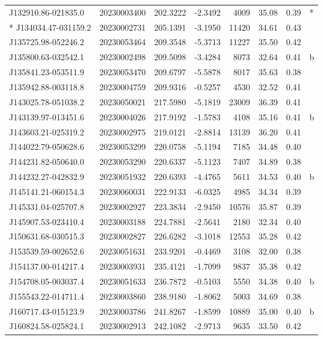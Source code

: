 \documentclass{article}
\begin{document}
\begin {longtable}{|l|l|r|r|r|r|r|l|}
 J132910.86-021835.0&  20230003400&  202.3222&   -2.3492&  4009& 35.08& 0.39&*\\*
 J134034.47-031159.2&  20230002731&  205.1391&   -3.1950& 11420& 34.61& 0.43&\\
 J135725.98-052246.2&  20230053464&  209.3548&   -5.3713& 11227& 35.50& 0.42&\\
 J135800.63-032542.1&  20230002498&  209.5098&   -3.4284&  8073& 32.64& 0.41&b\\%
 J135841.23-053511.9&  20230053470&  209.6797&   -5.5878&  8017& 35.63& 0.38&\\
 J135942.88-003118.8&  20230004759&  209.9316&   -0.5257&  4530& 32.52& 0.41&\\
 J143025.78-051038.2&  20230050021&  217.5980&   -5.1819& 23009& 36.39& 0.41&\\
 J143139.97-013451.6&  20230004026&  217.9192&   -1.5783&  4108& 35.16& 0.41&b\\%
 J143603.21-025319.2&  20230002975&  219.0121&   -2.8814& 13139& 36.20& 0.41&\\
 J144022.79-050628.6&  20230053299&  220.0758&   -5.1194&  7185& 34.48& 0.40&\\
 J144231.82-050640.0&  20230053290&  220.6337&   -5.1123&  7407& 34.89& 0.38&\\
 J144232.27-042832.9&  20230051932&  220.6393&   -4.4765&  5611& 34.53& 0.40&b\\%
 J145141.21-060154.3&  20230060031&  222.9133&   -6.0325&  4985& 34.34& 0.39&\\
 J145331.04-025707.8&  20230002927&  223.3834&   -2.9450& 10576& 35.87& 0.39&\\
 J145907.53-023410.4&  20230003188&  224.7881&   -2.5641&  2180& 32.34& 0.40&\\
 J150631.68-030515.3&  20230002827&  226.6282&   -3.1018& 12553& 35.28& 0.42&\\
 J153539.59-002652.6&  20230051631&  233.9201&   -0.4469&  3108& 32.00& 0.38&\\
 J154137.00-014217.4&  20230003931&  235.4121&   -1.7099&  9837& 35.38& 0.42&\\
 J154708.05-003037.4&  20230051633&  236.7872&   -0.5103&  5550& 34.38& 0.40&b\\%
 J155543.22-014711.4&  20230003860&  238.9180&   -1.8062&  5003& 34.69& 0.38&\\
 J160717.43-015123.9&  20230003786&  241.8267&   -1.8599& 10889& 35.00& 0.40&b\\%
 J160824.58-025824.1&  20230002913&  242.1082&   -2.9713&  9635& 33.50& 0.42&\\

\end{longtable}
\end{document}
